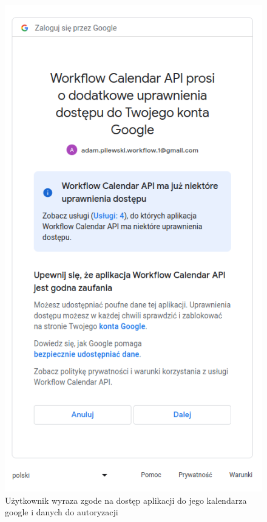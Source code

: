 \documentclass[a4paper, 12pt]{article}
\begin{document}
\begin{figure}[H]
	\centering
    \includegraphics*[scale=0.4]{img/google-auth-permissions.png}
	\caption{Użytkownik wyraza zgode na dostęp aplikacji do jego kalendarza google i danych do autoryzacji}
\end{figure}
\end{document}
